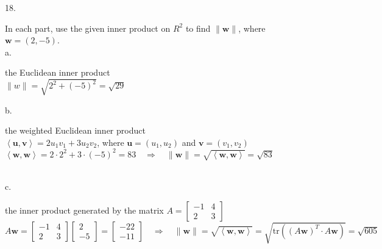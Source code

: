 \documentclass[12pt]{book}
\begin{document}
\begin{CJK}{UTF8}{bsmi}
18. \begin{minipage}[t]{\dimexpr\linewidth}
In each part, use the given inner product on $R^2$ to find $\parallel \textbf{w}\parallel$, where $\textbf{w}=(2,-5)$. \\
a. \begin{minipage}[t]{\dimexpr\linewidth}
the Euclidean inner product \\
$\parallel w\parallel=\sqrt{2^2+(-5)^2}=\sqrt{29}$
\end{minipage}
b. \begin{minipage}[t]{\dimexpr\linewidth}
the weighted Euclidean inner product \\
$\left\langle \textbf{u},\textbf{v} \right\rangle=2u_1v_1+3u_2v_2$, where $\textbf{u}=(u_1,u_2)$ and $\textbf{v}=(v_1,v_2)$ \\
$\left\langle \textbf{w},\textbf{w} \right\rangle=2\cdot2^2+3\cdot(-5)^2=83\quad\Rightarrow\quad\parallel\textbf{w}\parallel=\sqrt{\left\langle \textbf{w},\textbf{w} \right\rangle}=\sqrt{83}$
\end{minipage} \\
c. \begin{minipage}[t]{\dimexpr\linewidth}
the inner product generated by the matrix $A=\begin{bmatrix}
-1 & 4 \\
2 & 3
\end{bmatrix}$ \\[-5pt]
$A\textbf{w}=\begin{bmatrix}
-1 & 4 \\
2 & 3
\end{bmatrix}\begin{bmatrix}
2 \\ -5
\end{bmatrix}=\begin{bmatrix}
-22 \\ -11
\end{bmatrix}\quad\Rightarrow\quad\parallel\textbf{w}\parallel=\sqrt{\left\langle \textbf{w},\textbf{w} \right\rangle}=\sqrt{\mathrm{tr}((A\textbf{w})^T\cdot A\textbf{w})}=\sqrt{605}$
\end{minipage}
\end{minipage}


\end{CJK}
\end{document}
